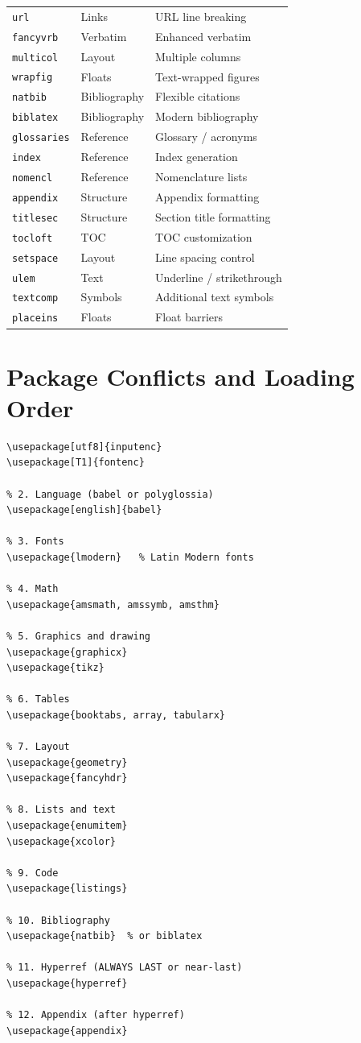 \begin{longtable}{lp{4cm}p{6cm}}
\texttt{url}       & Links      & URL line breaking \\
\texttt{fancyvrb}  & Verbatim   & Enhanced verbatim \\
\texttt{multicol}  & Layout     & Multiple columns \\
\texttt{wrapfig}   & Floats     & Text-wrapped figures \\
\texttt{natbib}    & Bibliography & Flexible citations \\
\texttt{biblatex}  & Bibliography & Modern bibliography \\
\texttt{glossaries}& Reference  & Glossary / acronyms \\
\texttt{index}     & Reference  & Index generation \\
\texttt{nomencl}   & Reference  & Nomenclature lists \\
\texttt{appendix}  & Structure  & Appendix formatting \\
\texttt{titlesec}  & Structure  & Section title formatting \\
\texttt{tocloft}   & TOC        & TOC customization \\
\texttt{setspace}  & Layout     & Line spacing control \\
\texttt{ulem}      & Text       & Underline / strikethrough \\
\texttt{textcomp}  & Symbols    & Additional text symbols \\
\texttt{placeins}  & Floats     & Float barriers \\
\end{longtable}

\section{Package Conflicts and Loading Order}

\begin{lstlisting}[language={[LaTeX]TeX}, caption=Recommended loading order]
% 1. Encoding
\usepackage[utf8]{inputenc}
\usepackage[T1]{fontenc}

% 2. Language (babel or polyglossia)
\usepackage[english]{babel}

% 3. Fonts
\usepackage{lmodern}   % Latin Modern fonts

% 4. Math
\usepackage{amsmath, amssymb, amsthm}

% 5. Graphics and drawing
\usepackage{graphicx}
\usepackage{tikz}

% 6. Tables
\usepackage{booktabs, array, tabularx}

% 7. Layout
\usepackage{geometry}
\usepackage{fancyhdr}

% 8. Lists and text
\usepackage{enumitem}
\usepackage{xcolor}

% 9. Code
\usepackage{listings}

% 10. Bibliography
\usepackage{natbib}  % or biblatex

% 11. Hyperref (ALWAYS LAST or near-last)
\usepackage{hyperref}

% 12. Appendix (after hyperref)
\usepackage{appendix}
\end{lstlisting}

